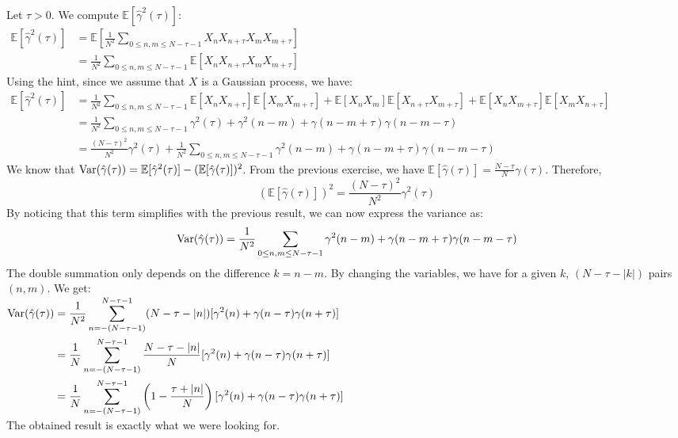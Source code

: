 \documentclass[11pt]{article}
\begin{document}
\begin{solution}
    Let $\tau > 0$. We compute $\mathbb{E}[\hat{\gamma}^2(\tau)]$:\\
    $\begin{aligned}
        \mathbb{E}[\hat{\gamma}^2(\tau)]
        &= \mathbb{E} \left[ \frac{1}{N^2} \sum_{0\leq n, m \leq N - \tau -1} X_n X_{n + \tau} X_m X_{m + \tau} \right]\\
        &= \frac{1}{N^2} \sum_{0\leq n, m \leq N - \tau -1} \mathbb{E}[X_n X_{n + \tau} X_m X_{m + \tau}]
    \end{aligned}$\\
    Using the hint, since we assume that $X$ is a Gaussian process, we have:\\
    $\begin{aligned}
        \mathbb{E}[\hat{\gamma}^2(\tau)]
        &= \frac{1}{N^2} \sum_{0\leq n, m \leq N - \tau -1} \mathbb{E}[X_n X_{n + \tau}] \mathbb{E}[X_m X_{m + \tau}] + \mathbb{E}[X_n X_m] \mathbb{E}[X_{n + \tau} X_{m + \tau}] + \mathbb{E}[X_n X_{m + \tau}] \mathbb{E}[X_m X_{n + \tau}]\\
        &= \frac{1}{N^2} \sum_{0\leq n, m \leq N - \tau -1} \gamma^2(\tau) + \gamma^2(n - m) + \gamma(n - m + \tau) \gamma(n - m - \tau)\\
        &= \frac{(N - \tau)^2}{N^2} \gamma^2 (\tau) + \frac{1}{N^2} \sum_{0\leq n, m \leq N - \tau -1} \gamma^2(n - m) + \gamma(n - m + \tau) \gamma(n - m - \tau)
    \end{aligned}$\\
    We know that $\mathrm{Var} (\hat{\gamma}(\tau)) = \mathbb{E}[\hat{\gamma}^2(\tau)] - (\mathbb{E}[\hat{\gamma}(\tau)])^2$. From the previous exercise, we have $\mathbb{E}[\hat{\gamma}(\tau)] = \frac{N - \tau}{N} \gamma(\tau)$. Therefore, $$(\mathbb{E}[\hat{\gamma}(\tau)])^2 = \frac{(N - \tau)^2}{N^2} \gamma^2 (\tau)$$
    By noticing that this term simplifies with the previous result, we can now express the variance as:
    $$\mathrm{Var} (\hat{\gamma}(\tau)) = \frac{1}{N^2} \sum_{0\leq n, m \leq N - \tau -1} \gamma^2(n - m) + \gamma(n - m + \tau) \gamma(n - m - \tau)$$
    The double summation only depends on the difference $k = n - m$. By changing the variables, we have for a given $k$, $(N - \tau - |k|)$ pairs $(n, m)$. We get:\\
    $\begin{aligned}
        \mathrm{Var} (\hat{\gamma}(\tau)) 
        &= \frac{1}{N^2} \sum_{n = -(N - \tau - 1)}^{N - \tau - 1} (N - \tau - |n|) [\gamma^2 (n) + \gamma (n - \tau) \gamma (n + \tau)]\\
        &= \frac{1}{N} \sum_{n = -(N - \tau - 1)}^{N - \tau - 1} \frac{N - \tau - |n|}{N} [\gamma^2 (n) + \gamma (n - \tau) \gamma (n + \tau)]\\
        &= \frac{1}{N} \sum_{n = -(N - \tau - 1)}^{N - \tau - 1}  \left( 1 - \frac{\tau + |n|}{N}\right) [\gamma^2 (n) + \gamma (n - \tau) \gamma (n + \tau)]
    \end{aligned}$\\
    The obtained result is exactly what we were looking for.


\end{solution}
\end{document}
